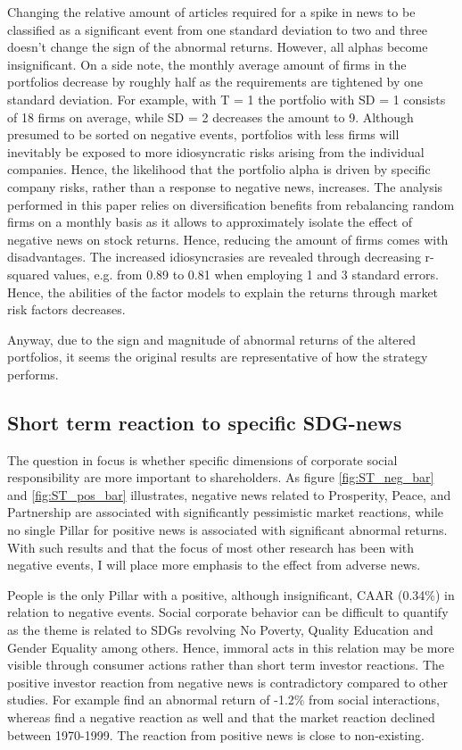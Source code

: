 Changing the relative amount of articles required for a spike in news to be classified as a significant event from one standard deviation to two and three doesn't change the sign of the abnormal returns. However, all alphas become insignificant. On a side note, the monthly average amount of firms in the portfolios decrease by roughly half as the requirements are tightened by one standard deviation. For example, with T = 1 the portfolio with SD = 1 consists of 18 firms on average, while SD = 2 decreases the amount to 9. Although presumed to be sorted on negative events, portfolios with less firms will inevitably be exposed to more idiosyncratic risks arising from the individual companies. Hence, the likelihood that the portfolio alpha is driven by specific company risks, rather than a response to negative news, increases. The analysis performed in this paper relies on diversification benefits from rebalancing random firms on a monthly basis as it allows to approximately isolate the effect of negative news on stock returns. Hence, reducing the amount of firms comes with disadvantages. The increased idiosyncrasies are revealed through decreasing r-squared values, e.g. from 0.89 to 0.81 when employing 1 and 3 standard errors. Hence, the abilities of the factor models to explain the returns through market risk factors decreases. 

Anyway, due to the sign and magnitude of abnormal returns of the altered portfolios, it seems the original results are representative of how the strategy performs. 


\subsection{Short term reaction  to specific SDG-news}

The question in focus is whether specific dimensions of corporate social responsibility are more important to shareholders. As figure \ref{fig:ST_neg_bar} and \ref{fig:ST_pos_bar} illustrates, negative news related to Prosperity, Peace, and Partnership are associated with significantly pessimistic market reactions, while no single Pillar for positive news is associated with significant abnormal returns. With such results and that the focus of most other research has been with negative events, I will place more emphasis to the effect from adverse news.

People is the only Pillar with a positive, although insignificant, CAAR (0.34\%) in relation to negative events. Social corporate behavior can be difficult to quantify as the theme is related to SDGs 
 revolving No Poverty, Quality Education and Gender Equality among others. Hence, immoral acts in this relation may be more visible through consumer actions rather than short term investor reactions. The positive investor reaction from negative news is contradictory compared to other studies. For example \cite{chen2001layoffs} find an abnormal return of -1.2\% from social interactions, whereas \citep{farber2009changing} find a negative reaction as well and that the market reaction declined between 1970-1999. The reaction from positive news is close to non-existing. 

